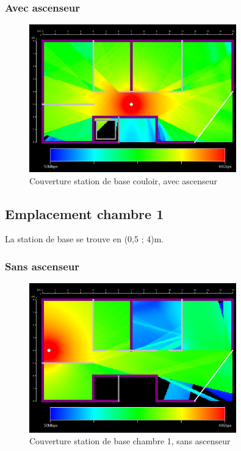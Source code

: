 \subsubsection{Avec ascenseur}

\begin{figure}[H]
    \centering
    \includegraphics[width=0.8\textwidth]{latex/images/highres-couloir-with-lift.png}
    \caption{Couverture station de base couloir, avec ascenseur}
    \label{fig:simu-emplacement-couloir-avecasc}
\end{figure}


\subsection{Emplacement chambre 1}
La station de base se trouve en (0,5 ; 4)m.

\subsubsection{Sans ascenseur}

\begin{figure}[H]
    \centering
    \includegraphics[width=0.8\textwidth]{latex/images/highres-chambre1-without-lift.png}
    \caption{Couverture station de base chambre 1, sans ascenseur}
    \label{fig:simu-emplacement-chambre1-sansasc}
\end{figure}
